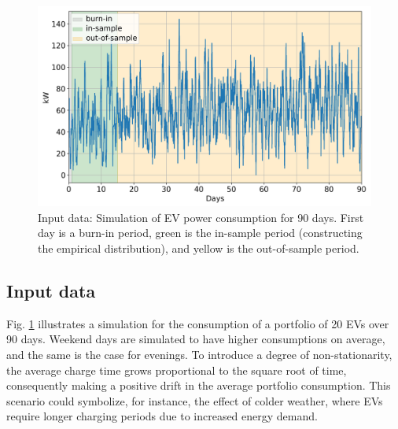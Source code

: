 \documentclass[conference]{IEEEtran}
\begin{document}


\begin{figure}[t]
    \centering
    \includegraphics[width=\columnwidth]{../figures/drjcc_raw.png}
    \caption{\small{Input data: Simulation of \ac{EV} power consumption for 90 days. First day is a burn-in period, green is the in-sample period (constructing the empirical distribution), and yellow is the out-of-sample period.}}
    \label{fig:drjcc_raw}
\end{figure}

\vspace{2mm}
\subsection{Input data}\label{sec:sim-setup}
\vspace{-1mm}

Fig. \ref{fig:drjcc_raw} illustrates a simulation for the consumption of a portfolio of 20 \acp{EV} over 90 days. Weekend days are simulated to have higher consumptions on average, and the same is the case for evenings. To introduce a degree of  non-stationarity, the average charge time grows proportional to the square root of time, consequently making a positive drift in the average portfolio consumption. This scenario could symbolize, for instance, the effect of colder weather, where \acp{EV} require longer charging periods due to increased energy demand.
\end{document}

